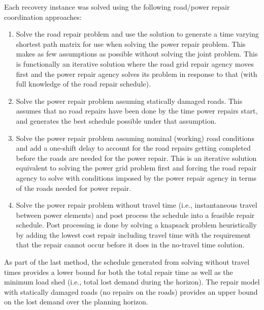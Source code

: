 \documentclass[10pt]{article}
\begin{document}
 Each recovery instance was solved using the following road/power repair coordination approaches:
 \vspace{-8pt}
 \begin{enumerate}
 	\item Solve the road repair problem and use the solution to generate a time varying shortest path matrix for use when solving the power repair problem. This makes as few assumptions as possible without solving the joint problem. This is functionally an iterative solution where the road grid repair agency moves first and the power repair agency solves its problem in response to that (with full knowledge of the road repair schedule).
 	\item Solve the power repair problem assuming statically damaged roads. This assumes that no road repairs have been done by the time power repairs  start, and generates the best schedule possible under that assumption.
 	\item Solve the power repair problem assuming nominal (working) road conditions and add a one-shift delay to account for the road repairs getting completed  before the roads are needed for the power repair. This is an iterative solution equivalent to solving the power grid problem first and forcing the road repair agency to solve with conditions imposed by the power repair agency in terms of the roads needed for power repair.
 	\item Solve the power repair problem without travel time (i.e., instantaneous travel between power elements) and post process the schedule into a feasible repair schedule. Post processing is done by solving a knapsack problem heuristically by adding the lowest cost repair including travel time with the requirement that the repair cannot occur before it does in the no-travel time solution.
 \end{enumerate}
\vspace{-8pt}
As part of the last method, the schedule generated from solving without travel times provides a lower bound for both the total repair time as well as the minimum load shed (i.e., total lost demand during the horizon). The repair model with statically damaged roads (no repairs on the roads) provides an upper bound on the lost demand over the planning horizon.
\end{document}
